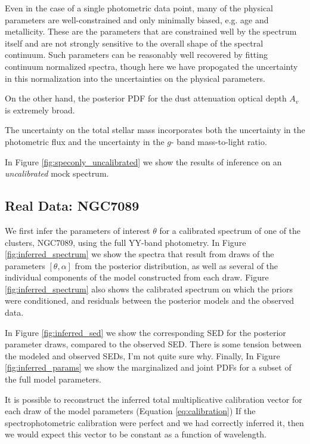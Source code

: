 \documentclass[iop,numberedappendix]{emulateapj}
\newcommand{\excluster}{NGC7089}
\begin{document}
Even in the case of a single photometric data point, many of the
physical parameters are well-constrained and only minimally biased,
e.g. age and metallicity.  These are the parameters that are
constrained well by the spectrum itself and are not strongly sensitive
to the overall shape of the spectral continuum.  Such parameters can
be reasonably well recovered by fitting continuum normalized spectra,
though here we have propogated the uncertainty in this normalization
into the uncertainties on the physical parameters.

On the other hand, the posterior PDF for the dust attenuation optical
depth $A_v$ is extremely broad. 

The uncertainty on the total stellar mass incorporates both the
uncertainty in the photometric flux and the uncertainty in the $g$-
band mass-to-light ratio.

In Figure \ref{fig:speconly_uncalibrated} we show the results of
inference on an \emph{uncalibrated} mock spectrum.


\subsection{Real Data: \excluster} 
We first infer the parameters of interest $\theta$ for a calibrated
spectrum of one of the clusters, \excluster, using the full YY-band
photometry. In Figure \ref{fig:inferred_spectrum} we show the spectra
that result from draws of the parameters $[\theta,\alpha]$ from the
posterior distribution, as well as several of the individual
components of the model constructed from each draw. Figure
\ref{fig:inferred_spectrum} also shows the calibrated spectrum on
which the priors were conditioned, and residuals between the posterior
models and the observed data.  

In Figure \ref{fig:inferred_sed} we show the corresponding SED for the
posterior parameter draws, compared to the observed SED. There is some
tension between the modeled and observed SEDs, I'm not quite sure
why. Finally, In Figure \ref{fig:inferred_params} we show the
marginalized and joint PDFs for a subset of the full model parameters.

It is possible to reconstruct the inferred total multiplicative
calibration vector for each draw of the model parameters (Equation
\ref{eq:calibration}) If the spectrophotometric calibration were
perfect and we had correctly inferred it, then we would expect this
vector to be constant as a function of wavelength.
\end{document}
